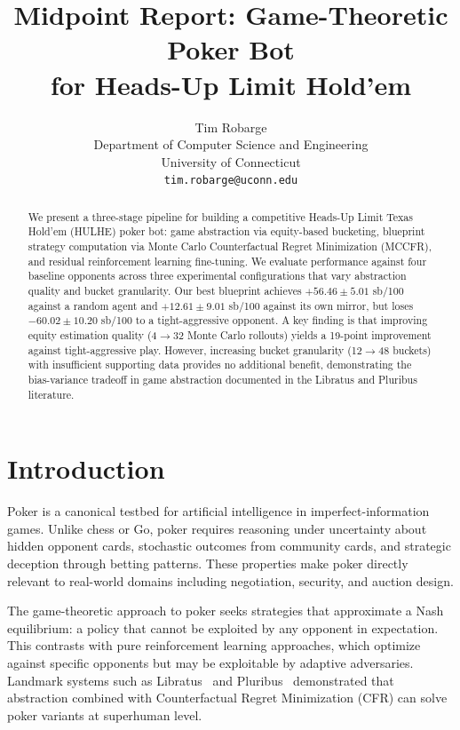 \documentclass{article}
\title{Midpoint Report: Game-Theoretic Poker Bot\\for Heads-Up Limit Hold'em}
\author{
Tim Robarge \\
Department of Computer Science and Engineering\\
University of Connecticut\\
\texttt{tim.robarge@uconn.edu}
}
\begin{document}
\maketitle

\begin{abstract}
We present a three-stage pipeline for building a competitive Heads-Up Limit Texas Hold'em (HULHE) poker bot: game abstraction via equity-based bucketing, blueprint strategy computation via Monte Carlo Counterfactual Regret Minimization (MCCFR), and residual reinforcement learning fine-tuning. We evaluate performance against four baseline opponents across three experimental configurations that vary abstraction quality and bucket granularity. Our best blueprint achieves $+56.46 \pm 5.01$ sb/100 against a random agent and $+12.61 \pm 9.01$ sb/100 against its own mirror, but loses $-60.02 \pm 10.20$ sb/100 to a tight-aggressive opponent. A key finding is that improving equity estimation quality (4$\to$32 Monte Carlo rollouts) yields a 19-point improvement against tight-aggressive play. However, increasing bucket granularity (12$\to$48 buckets) with insufficient supporting data provides no additional benefit, demonstrating the bias-variance tradeoff in game abstraction documented in the Libratus and Pluribus literature.
\end{abstract}

\section{Introduction}

Poker is a canonical testbed for artificial intelligence in imperfect-information games. Unlike chess or Go, poker requires reasoning under uncertainty about hidden opponent cards, stochastic outcomes from community cards, and strategic deception through betting patterns. These properties make poker directly relevant to real-world domains including negotiation, security, and auction design.

The game-theoretic approach to poker seeks strategies that approximate a Nash equilibrium: a policy that cannot be exploited by any opponent in expectation. This contrasts with pure reinforcement learning approaches, which optimize against specific opponents but may be exploitable by adaptive adversaries. Landmark systems such as Libratus~\cite{brown2017superhuman} and Pluribus~\cite{brown2019superhuman} demonstrated that abstraction combined with Counterfactual Regret Minimization (CFR) can solve poker variants at superhuman level.
\end{document}
